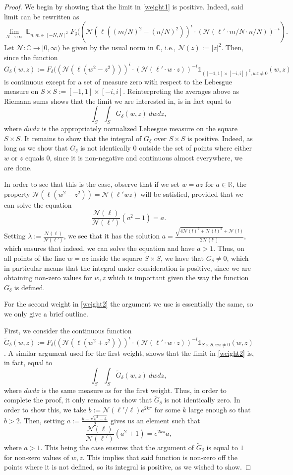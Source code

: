 \documentclass[11pt]{amsart}
\theoremstyle{definition}
\DeclareMathOperator*{\E}{\mathbb{E}}
\newcommand{\C}{{\mathbb C}}
\newcommand{\NN}{{\mathcal N}}
\newcommand{\R}{{\mathbb R}}
\begin{document}
\begin{proof}
We begin by showing that the limit in \eqref{weight1} is positive. Indeed, said limit can be rewritten as
\[
\lim_{N \to \infty} \E_{n, m \in [-N,N]^2 }F_{\delta}((\NN(\ell((m/N)^2-(n/N)^2))^i\cdot (\NN(\ell'\cdot m/N\cdot n/N))^{-i}).
\]
Let $\NN: \C \to [0,\infty)$ be given by the usual norm in $\C$, i.e., $\NN(z):=|z|^2$. Then, since the function $G_{\delta}(w,z):=F_{\delta}( (\NN(\ell(w^2-z^2)))^i \cdot (\NN(\ell'\cdot w \cdot z))^{-i} \mathds{1}_{([-1,1] \times [-i,i])^2, wz \neq 0}(w,z)$ is continuous except for a set of measure zero with respect to the Lebesgue measure on $S \times S:=[-1,1] \times [-i,i]$. Reinterpreting the averages above as Riemann sums shows that the limit we are interested in, is in fact equal to
\[
\int_{S}\int_{S} G_{\delta}(w,z) \ dwdz,
\]
where $dwdz$ is the appropriately normalized Lebesgue measure on the square $S \times S$. It remains to show that the integral of $G_{\delta}$ over $S \times S$ is positive. Indeed, as long as we show that $G_{\delta}$ is not identically $0$ outside the set of points where either $w$ or $z$ equals $0$, since it is non-negative and continuous almost everywhere, we are done. 

In order to see that this is the case, observe that if we set $w=az$ for $a \in \R$, the property $\NN(\ell(w^2-z^2))=\NN(\ell'wz)$ will be satisfied, provided that we can solve the equation 
\[
\frac{\NN(\ell)}{\NN(\ell')}(a^2-1)=a.
\]
Setting $\lambda:=\frac{\NN(\ell)}{\NN(\ell')}$, we see that it has the solution $a = \frac{\sqrt{4\NN(l)^2+\NN(l)^2}+\NN(l)}{2\NN(l')}$, which ensures that indeed, we can solve the equation and have $a>1 $. Thus, on all points of the line $w=az$ inside the square $S \times S$, we have that $G_{\delta} \neq 0$, which in particular means that the integral under consideration is positive, since we are obtaining non-zero values for $w, z$ which is important given the way the function $G_{\delta}$ is defined.

For the second weight in \eqref{weight2} the argument we use is essentially the same, so we only give a brief outline.

First, we consider the continuous function $\tilde{G}_{\delta}(w,z):=F_{\delta}( (\NN(\ell(w^2+z^2)))^i \cdot (\NN(\ell'\cdot w \cdot z))^{-i}\mathds{1}_{S \times S, wz \neq 0}(w,z)$. A similar argument used for the first weight, shows that the limit in \eqref{weight2} is, in fact, equal to
\[
\int_{S}\int_{S} \tilde{G}_{\delta}(w,z) \ dwdz,
\]
where $dwdz$ is the same measure as for the first weight. Thus, in order to complete the proof, it only remains to show that $\tilde{G}_{\delta}$ is not identically zero. In order to show this, we take $b:=\NN(\ell'/\ell)e^{2k\pi}$ for some $k$ large enough so that $b>2$. Then, setting $a:=\frac{b+\sqrt{b^2-4}}{2}$ gives us an element such that
\[
\frac{\NN(\ell)}{\NN(\ell')}(a^2+1) = e^{2k\pi} a,
\]
where $a>1$. This being the case ensures that the argument of $\tilde{G}_{\delta}$ is equal to $1$ for non-zero values of $w, z$. This implies that said function is non-zero off the points where it is not defined, so its integral is positive, as we wished to show.
\end{proof}
\end{document}

